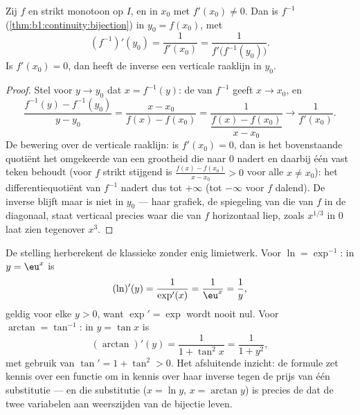 \begin{theorem}\label{thm:b1:derivative:inverse}
Zij $f$  en strikt monotoon op $I$, en  in $x_0$
met $f'(x_0) \neq 0$. Dan is $f^{-1}$
(\cref{thm:b1:continuity:bijection})  in $y_0 = f(x_0)$,
met
\[
(f^{-1})'(y_0) = \frac{1}{f'(x_0)} = \frac{1}{f'\bigl(f^{-1}(y_0)\bigr)} .
\]
Is $f'(x_0) = 0$, dan heeft de inverse een verticale raaklijn in
$y_0$.
\end{theorem}

\begin{proof}
Stel voor $y \to y_0$ dat $x = f^{-1}(y)$: de  van
$f^{-1}$ geeft $x \to x_0$, en
\[
\frac{f^{-1}(y) - f^{-1}(y_0)}{y - y_0}
= \frac{x - x_0}{f(x) - f(x_0)}
= \frac{1}{\dfrac{f(x) - f(x_0)}{x - x_0}}
\longrightarrow \frac{1}{f'(x_0)} .
\]
De bewering over de verticale raaklijn: is $f'(x_0) = 0$, dan is
het bovenstaande quotiënt het omgekeerde van een grootheid die
naar $0$ nadert en daarbij één vast teken behoudt (voor $f$ strikt
stijgend is $\frac{f(x) - f(x_0)}{x - x_0} > 0$ voor alle $x \neq
x_0$): het differentiequotiënt van $f^{-1}$ nadert dus tot
$+\infty$ (tot $-\infty$ voor $f$ dalend). De inverse blijft
 maar is niet  in $y_0$ --- haar grafiek, de
spiegeling van die van $f$ in de diagonaal, staat verticaal
precies waar die van $f$ horizontaal liep, zoals $x^{1/3}$ in $0$
laat zien tegenover $x^3$.
\end{proof}

\begin{example}\label{ex:b1:derivative:inverseaction}
De stelling herberekent de klassieke  zonder enig
limietwerk. Voor $\ln = \exp^{-1}$: in $y = \eu^x$ is
\[
(\ln)'(y) = \frac{1}{\exp'(x)} = \frac{1}{\eu^{x}} = \frac1y ,
\]
geldig voor elke $y > 0$, want $\exp' = \exp$ wordt nooit nul.
Voor $\arctan = \tan^{-1}$: in $y = \tan x$ is
\[
(\arctan)'(y) = \frac{1}{1 + \tan^2 x} = \frac{1}{1 + y^2} ,
\]
met gebruik van $\tan' = 1 + \tan^2 > 0$. Het afsluitende
inzicht: de formule zet kennis over een functie om in kennis over
haar inverse tegen de prijs van één substitutie --- en die
substitutie ($x = \ln y$, $x = \arctan y$) is precies de 
dat de twee variabelen aan weerszijden van de bijectie leven.
\end{example}

